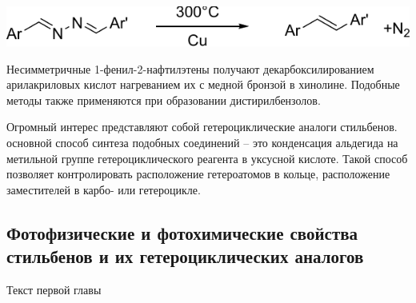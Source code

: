 			\begin{scheme}
				\includegraphics{Dissertation/images/part1/Stylbenes3}	
			\end{scheme}
		
			Несимметричные 1-фенил-2-нафтилэтены получают декарбоксилированием арилакриловых кислот нагреванием их с медной бронзой в хинолине. Подобные методы также применяются при образовании дистирилбензолов.
			
			Огромный интерес представляют собой гетероциклические аналоги стильбенов. \cite{Taek1987, Liang2003, Lipunova2011} основной способ синтеза подобных соединений -- это конденсация альдегида на метильной группе гетероциклического реагента в уксусной кислоте. \cite{Nosova2011, Lipunova2011, Ouyang2009a, Wang2009, Liang2003, Yim2008, Cazaux1993} Такой способ позволяет контролировать расположение гетероатомов в кольце, расположение заместителей в карбо- или гетероцикле. \cite{Jedrzejewska2010, Jagani2012} 
		
		
		\subsection{Фотофизические и фотохимические свойства стильбенов и их гетероциклических аналогов}
		
			Текст первой главы
			
			\begin{scheme}
			\end{scheme}
			
			
			
			
			